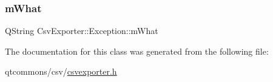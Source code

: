 \subsubsection{\texorpdfstring{mWhat}{mWhat}}
{\footnotesize\ttfamily Q\+String Csv\+Exporter\+::\+Exception\+::m\+What\hspace{0.3cm}{\ttfamily [protected]}}



The documentation for this class was generated from the following file\+:\begin{DoxyCompactItemize}
\item 
qtcommons/csv/\mbox{\hyperlink{csvexporter_8h}{csvexporter.\+h}}\end{DoxyCompactItemize}
